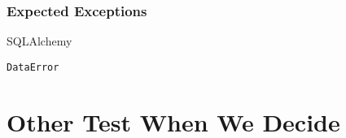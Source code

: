 \documentclass[12pt]{article}
\begin{document}
\subsubsection{Expected Exceptions}

SQLAlchemy 

\begin{verbatim}
DataError
\end{verbatim}

\section{Other Test When We Decide}







\end{document}
